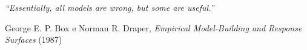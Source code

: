 \begin{minipage}{.8\textwidth}
\raggedleft
\textit{``Essentially, all models are wrong, but some are useful.''}

\vspace{0.5cm}
George E. P. Box e Norman R. Draper, \textit{Empirical Model-Building and Response Surfaces} (1987)
\end{minipage}

